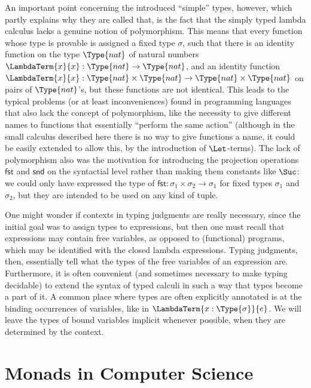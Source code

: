 An important point concerning the introduced ``simple'' types, however, which
partly explains why they are called that, is the fact that the simply typed
lambda calculus lacks a genuine notion of polymorphism. This means that every
function whose type is provable is assigned a fixed type $\sigma$, such that there is
an identity function on the type $\Type{nat}$ of natural numbers
$\LambdaTerm{x}{x}: \Type{nat}\to\Type{nat}$, and an identity function
$\LambdaTerm{x}{x} : \Type{nat}\times \Type{nat} \to \Type{nat} \times \Type{nat}$ on pairs
of $\Type{nat}$'s, but these functions are not identical.  This leads to the
typical problems (or at least inconveniences) found in programming languages
that also lack the concept of polymorphism, like the necessity to give different
names to functions that essentially ``perform the same action'' (although in the
small calculus described here there is no way to give functions a name, it could
be easily extended to allow this, \EG by the introduction of $\Let$-terms). The
lack of polymorphism also was the motivation for introducing the projection
operations $\mathsf{fst}$ and $\mathsf{snd}$ on the syntactial level rather than
making them constants like $\Suc$: we could only have expressed the type of
$\mathsf{fst} : \sigma_1\times\sigma_2 \to \sigma_1$ for fixed types $\sigma_1$ and $\sigma_2$, but they are
intended to be used on any kind of tuple.


One might wonder if contexts in typing judgments are really necessary, since the
initial goal was to assign types to expressions, but then one must recall that
expressions may contain free variables, as opposed to (functional) programs,
which may be identified with the closed lambda expressions. Typing judgments,
then, essentially tell what the types of the free variables of an expression
are. Furthermore, it is often convenient (and sometimes necessary to make typing
decidable) to extend the syntax of typed calculi in such a way that types become
a part of it. A common place where types are often explicitly annotated is at
the binding occurrences of variables, like in $\LambdaTerm{x:\Type{\sigma}}{e}$. We
will leave the types of bound variables implicit whenever possible, \IE when
they are determined by the context.



\section{Monads in Computer Science}
\label{sec:monads-cs}

